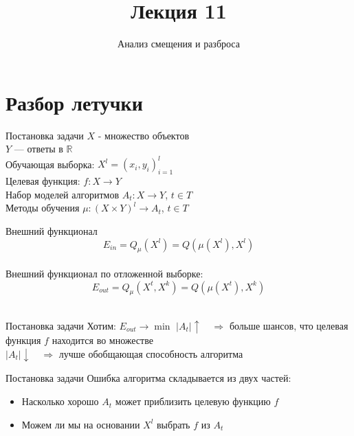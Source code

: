 \documentclass[10pt]{beamer}
\title{Лекция 11}
\subtitle{Анализ смещения и разброса}
\begin{document}
\section{Разбор летучки}

\maketitle

\begin{frame}{Постановка задачи}
  $X$ - множество объектов \\
	$Y$ — ответы в $\mathbb{R}$ \\
	Обучающая выборка: ${X^l = (x_i, y_i)_{i=1}^l}$ \\ 
	Целевая функция: $f: X \rightarrow Y$\\
	\bigbreak
	Набор моделей алгоритмов $A_t: X \rightarrow Y$, $t \in T$ \\
	Методы обучения $\mu: (X \times Y)^l \rightarrow A_t$, $t \in T$ \\
\end{frame}

\begin{frame}{Внешний функционал}  
  $$E_{in} = Q_{\mu}(X^l) = Q(\mu(X^l), X^l)$$\\
  \bigbreak
  Внешний функционал по отложенной выборке:\\
  $$E_{out} = Q_{\mu}(X^t, X^k) = Q(\mu(X^t), X^k)$$\\
\end{frame}

\begin{frame}{Постановка задачи}
  \alert{Хотим}: $E_{out} \rightarrow \min $
  \bigbreak
  \pause
  $\vert A_t \vert \uparrow \quad \Rightarrow$ больше шансов, что целевая функция $f$ находится во множестве \\
  $\vert A_t \vert \downarrow \quad \Rightarrow$ лучше обобщающая способность алгоритма
\end{frame}

\begin{frame}{Постановка задачи}
  Ошибка алгоритма складывается из двух частей:
  \begin{itemize}
    \item Насколько хорошо $A_t$ может приблизить целевую функцию $f$
    \item Можем ли мы на основании $X^l$ выбрать $f$ из $A_t$
  \end{itemize}
\end{frame}
\end{document}

